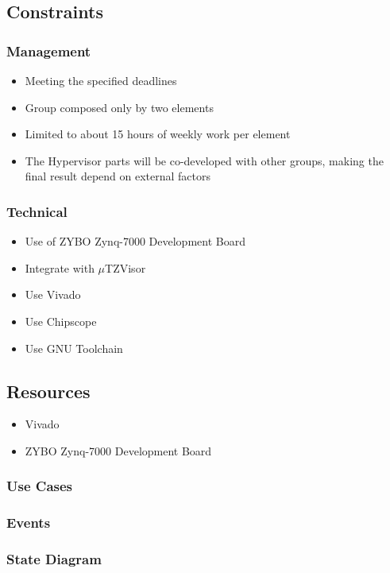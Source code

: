 \subsection{Constraints}

\subsubsection{Management}
\begin{itemize}  
	\item Meeting the specified deadlines
	\item Group composed only by two elements
	\item Limited to about 15 hours of weekly work per element
	\item The Hypervisor parts will be co-developed with other groups, making the final result depend on external factors
\end{itemize}

\subsubsection{Technical}
\begin{itemize}
	\item Use of ZYBO Zynq-7000 Development Board
	\item Integrate with \(\mu\)TZVisor
	\item Use Vivado
	\item Use Chipscope
	\item Use GNU Toolchain
\end{itemize}

\subsection{Resources}
\begin{itemize}
	\item Vivado
	\item ZYBO Zynq-7000 Development Board
\end{itemize}

\subsubsection{Use Cases}

\subsubsection{Events}

\subsubsection{State Diagram}

